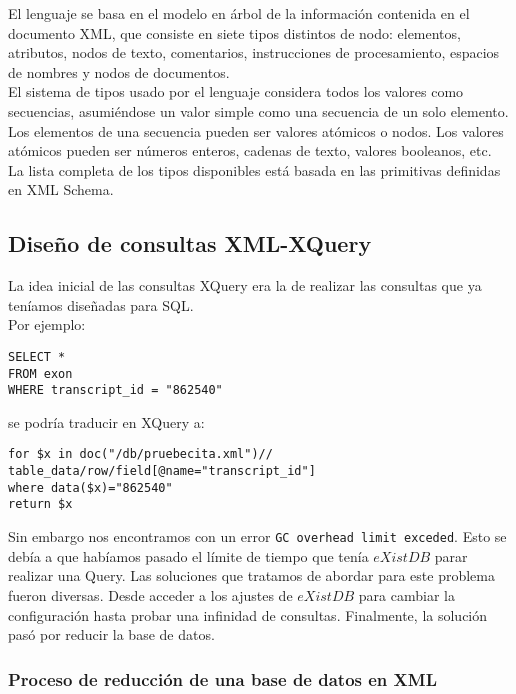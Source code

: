 \documentclass[12pt,a4paper]{article}
\begin{document}
El lenguaje se basa en el modelo en árbol de la información contenida en el documento XML, que consiste en siete tipos distintos de nodo: elementos, atributos, nodos de texto, comentarios, instrucciones de procesamiento, espacios de nombres y nodos de documentos.\\

El sistema de tipos usado por el lenguaje considera todos los valores como secuencias, asumiéndose un valor simple como una secuencia de un solo elemento. Los elementos de una secuencia pueden ser valores atómicos o nodos. Los valores atómicos pueden ser números enteros, cadenas de texto, valores booleanos, etc. La lista completa de los tipos disponibles está basada en las primitivas definidas en XML Schema.\\



\newpage
\subsection{Diseño de consultas XML-XQuery}  \label{pto42}

La idea inicial de las consultas XQuery era la de realizar las consultas que ya teníamos diseñadas para SQL.\\

Por ejemplo:

 \begin{verbatim}
SELECT *
FROM exon
WHERE transcript_id = "862540"
 \end{verbatim}
 
se podría traducir en XQuery a:

\begin{verbatim}
for $x in doc("/db/pruebecita.xml")//
table_data/row/field[@name="transcript_id"]
where data($x)="862540"
return $x
\end{verbatim}


Sin embargo nos encontramos con un error \verb|GC overhead limit exceded|. Esto se debía a que habíamos pasado el límite de tiempo que tenía $eXistDB$ parar realizar una Query. Las soluciones que tratamos de abordar para este problema fueron diversas. Desde acceder a los ajustes de $eXistDB$ para cambiar la configuración hasta probar una infinidad de consultas. Finalmente, la solución pasó por reducir la base de datos.





\subsubsection{Proceso de reducción de una base de datos en XML} \label{pto421}
\end{document}

